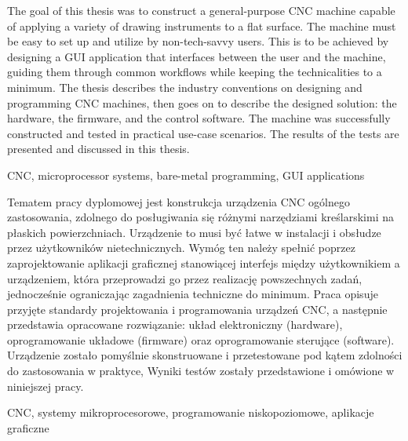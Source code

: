 \abstract
The goal of this thesis was to construct a general-purpose CNC machine capable
of applying a variety of drawing instruments to a flat surface. The machine
must be easy to set up and utilize by non-tech-savvy users. This is to be
achieved by designing a GUI application that interfaces between the user and the
machine, guiding them through common workflows while keeping the technicalities
to a minimum. The thesis describes the industry conventions on designing and
programming CNC machines, then goes on to describe the designed solution: the
hardware, the firmware, and the control software. The machine was successfully
constructed and tested in practical use-case scenarios. The results of the tests
are presented and discussed in this thesis.

\keywords CNC, microprocessor systems, bare-metal programming, GUI applications

\clearpage
\secondabstract
Tematem pracy dyplomowej jest konstrukcja urządzenia CNC ogólnego zastosowania,
zdolnego do posługiwania się różnymi narzędziami kreślarskimi na płaskich
powierzchniach. Urządzenie to musi być łatwe w instalacji i obsłudze przez
użytkowników nietechnicznych. Wymóg ten należy spełnić poprzez zaprojektowanie
aplikacji graficznej stanowiącej interfejs między użytkownikiem a urządzeniem,
która przeprowadzi go przez realizację powszechnych zadań, jednocześnie
ograniczając zagadnienia techniczne do minimum. Praca opisuje przyjęte standardy
projektowania i programowania urządzeń CNC, a następnie przedstawia opracowane
rozwiązanie: układ elektroniczny (hardware), oprogramowanie układowe (firmware)
oraz oprogramowanie sterujące (software). Urządzenie zostało pomyślnie
skonstruowane i przetestowane pod kątem zdolności do zastosowania w praktyce,
Wyniki testów zostały przedstawione i omówione w niniejszej pracy.

\secondkeywords CNC, systemy mikroprocesorowe, programowanie niskopoziomowe,
aplikacje graficzne
